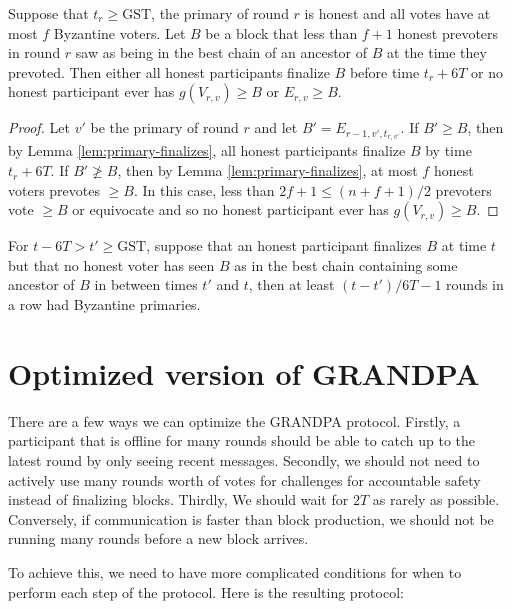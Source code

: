 \documentclass[a4paper,UKenglish,cleveref, autoref, thm-restate, anonymous]{lipics-v2019}
\def\GST{\mathrm{GST}}
\begin{document}
\begin{lemma} \label{lem:honest-recent-validity}
Suppose that $t_r \geq \GST$, the primary of round $r$ is honest and all votes have at most $f$ Byzantine voters.
Let $B$ be a block that less than $f+1$ honest prevoters in round $r$ saw as being in the best chain of an ancestor of $B$ at the time they prevoted.
Then either all honest participants finalize $B$ before time $t_r+6T$ or no honest participant ever has $g(V_{r,v}) \geq B$ or $E_{r,v} \geq B$.
\end{lemma}

\begin{proof} Let $v'$ be the primary of round $r$ and let $B'=E_{r-1,v',t_{r,v'}}$. If $B' \geq B$, then by Lemma \ref{lem:primary-finalizes}, all honest participants finalize $B$ by time $t_r+6T$. If $B' \not\geq B$, then by Lemma \ref{lem:primary-finalizes}, at most $f$ honest voters prevotes $\geq B$. In this case, less than $2f+1 \leq (n+f+1)/2$ prevoters vote $\geq B$ or equivocate and so no honest participant ever has $g(V_{r,v}) \geq B$.
\end{proof}


\begin{corollary} For $t - 6T > t' \geq \GST$, suppose that an honest participant finalizes $B$ at time $t$ but that no honest voter has seen $B$ as in the best chain containing some ancestor of $B$ in between times $t'$ and $t$, then at least $(t-t')/6T - 1$ rounds in a row had Byzantine primaries. \end{corollary}



\section{Optimized version of GRANDPA}

 There are a few ways we can optimize the GRANDPA protocol.
 Firstly, a participant that is offline for many rounds should be able to catch up to the latest round by only seeing recent messages.
 Secondly, we should not need to actively use many rounds worth of votes for challenges for accountable safety instead of finalizing blocks.
 Thirdly, We should wait for $2T$ as rarely as possible. Conversely, if communication is faster than block production, we should not be running many rounds before a new block arrives.
 
 To achieve this, we need to have more complicated conditions for when to perform each step of the protocol. Here is the resulting protocol:
 
\end{document}
